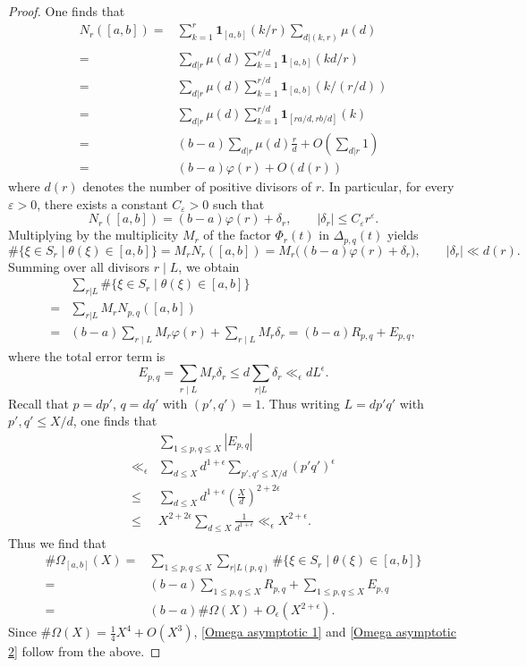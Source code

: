\documentclass[10pt,a4paper]{amsart}
\begin{document}
\begin{proof}
One finds that 
\[\begin{split}N_r([a,b])=&\sum_{k=1}^r \mathbf{1}_{[a,b]}(k/r)\sum_{d|(k,r)} \mu(d)\\
=& \sum_{d|r} \mu(d)\sum_{k=1}^{r/d} \mathbf{1}_{[a,b]}(kd/r)\\
=& \sum_{d|r} \mu(d)\sum_{k=1}^{r/d} \mathbf{1}_{[a,b]}(k/(r/d))\\
=& \sum_{d|r} \mu(d)\sum_{k=1}^{r/d} \mathbf{1}_{[ra/d,rb/d]}(k)\\
=& (b-a)\sum_{d|r} \mu(d)\frac{r}{d}+O\left(\sum_{d|r} 1\right)\\
=& (b-a)\varphi(r) + O(d(r))
\end{split}\]
where $d(r)$ denotes the number of positive divisors of $r$. In particular, for every $\varepsilon>0$, there exists a constant $C_\varepsilon>0$
such that
\[
N_r([a,b]) = (b-a)\varphi(r) + \delta_r, \qquad |\delta_r|\le C_\varepsilon r^\varepsilon.
\]
\noindent Multiplying by the multiplicity $M_r$ of the factor $\Phi_r(t)$ in
$\Delta_{p,q}(t)$ yields
\[
\#\{\xi\in S_r\mid \theta(\xi)\in[a,b]\}
= M_r N_r([a,b])
= M_r\big((b-a)\varphi(r)+\delta_r\big),
\qquad |\delta_r|\ll d(r).
\]
\noindent Summing over all divisors $r\mid L$, we obtain
\begin{equation}\label{eq:local-distribution}
\begin{split}
& \sum_{r|L}\# \{\xi\in S_r\mid \theta(\xi)\in [a,b]\}\\
=&\sum_{r|L} M_r N_{p,q}([a,b])\\
=&(b-a)\sum_{r\mid L} M_r\varphi(r)
+\sum_{r\mid L} M_r\delta_r
=(b-a)R_{p,q}+E_{p,q},
\end{split}
\end{equation}
where the total error term is
\[
E_{p,q}=\sum_{r\mid L}M_r\delta_r\leq d\sum_{r|L} \delta_r\ll_{\epsilon} d L^{\epsilon}.
\]
\noindent Recall that $p=dp'$, $q=dq'$ with $(p',q')=1$. Thus writing $L=d p'q'$ with $p',q'\le X/d$, one finds that
\[\begin{split}
&\sum_{1\le p,q\le X} |E_{p,q}| \\
\ll_{\epsilon} &\sum_{d\le X} d^{1+\epsilon} \sum_{p',q'\le X/d} (p'q')^\epsilon\\
\leq &\sum_{d\le X} d^{1+\epsilon} \left(\frac{X}{d}\right)^{2+2\epsilon} \\
\leq & X^{2+2\epsilon}\sum_{d\le X} \frac{1}{d^{1+\epsilon}}
\ll_{\epsilon} X^{2+\epsilon}.
\end{split}
\]
Thus we find that 
\[\begin{split}
    \# \Omega_{[a,b]}(X)= &
    \sum_{1\leq p,q\leq X}\sum_{r|L(p,q)}\# \{\xi\in S_r\mid \theta(\xi)\in [a,b]\}\\
    = &(b-a) \sum_{1\leq p,q\leq X} R_{p,q}+\sum_{1\leq p,q\leq X}E_{p,q}\\
    = &(b-a)\#\Omega(X)+O_{\epsilon}(X^{2+\epsilon}).
\end{split}\]
Since $\#\Omega(X)=\frac{1}{4} X^4+O(X^3)$, \eqref{Omega asymptotic 1} and \eqref{Omega asymptotic 2} follow from the above.
\end{proof}
\end{document}
